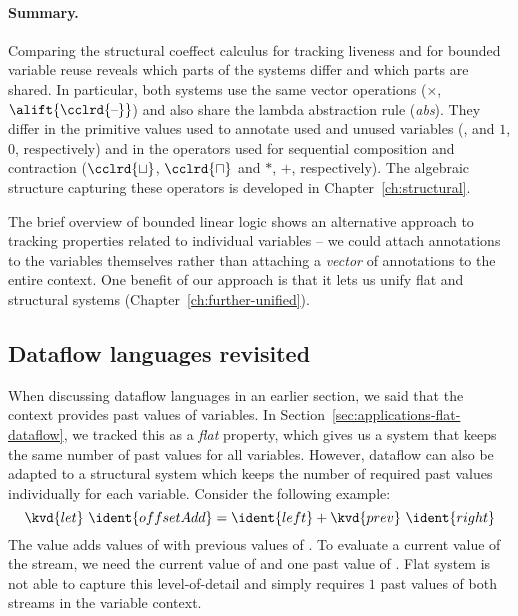 \paragraph{Summary.}
Comparing the structural coeffect calculus for tracking liveness and for bounded variable reuse
reveals which parts of the systems differ and which parts are shared. In particular, both systems
use the same vector operations ($\times$, $\alift{\cclrd{\textnormal{--}}}$) and also share the
lambda abstraction rule (\emph{abs}). They differ in the primitive values used to annotate used
and unused variables (,  and $1$, $0$, respectively) and in the operators used
for sequential composition and contraction ($\cclrd{\sqcup}$, $\cclrd{\sqcap}$ and $\ast$, $+$, respectively).
The algebraic structure capturing these operators is developed in Chapter~\ref{ch:structural}.

The brief overview of bounded linear logic shows an alternative approach to tracking properties
related to individual variables -- we could attach annotations to the variables themselves
rather than attaching a \emph{vector} of annotations to the entire context. One benefit
of our approach is that it lets us unify flat and structural systems (Chapter~\ref{ch:further-unified}).


\subsection{Dataflow languages revisited}
\label{sec:applications-structural-dataflow}

When discussing dataflow languages in an earlier section, we said that the context provides
past values of variables. In Section~\ref{sec:applications-flat-dataflow}, we tracked this as
a \emph{flat} property, which gives us a system that keeps the same number of past values for
all variables. However, dataflow can also be adapted to a structural system which keeps the number
of required past values individually for each variable. Consider the
following example:
%
\begin{equation*}
\kvd{let}~\ident{offsetAdd} = \ident{left} + \kvd{prev}~\ident{right}
\end{equation*}
%
The value  adds values of  with previous values of .
To evaluate a current value of the stream, we need the current value of  and one past
value of . Flat system is not able to capture this level-of-detail and simply
requires $1$ past values of both streams in the variable context.

